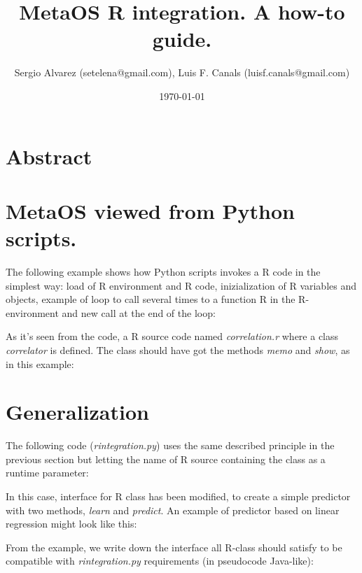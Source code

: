 \documentclass[11pt,a4paper]{article}
\title{MetaOS R integration. A how-to guide.}
\author{Sergio Alvarez (setelena@gmail.com),
    Luis F. Canals (luisf.canals@gmail.com)}
\begin{document}
\date{\today}
\maketitle


\section{Abstract}

\section{MetaOS viewed from Python scripts.}

The following example shows how Python scripts invokes a R code in 
the simplest way: load of R environment and R code, inizialization of R
variables and objects, example of loop to call several times to a function
R in the R-environment and new call at the end of the loop:

\lstset{language=Python,frame=single,tabsize=2,basicstyle=\tiny}


As it's seen from the code, a R source code named \emph{correlation.r}
where a class \emph{correlator} is defined. The class should have got the
methods \emph{memo} and \emph{show}, as in this example:

\lstset{language=R,frame=single,tabsize=2,basicstyle=\tiny}




\section{Generalization}

The following code (\emph{rintegration.py}) uses the same described principle 
in the previous section but letting the name of R source containing the 
class as a runtime parameter:

\lstset{language=Python,frame=single,tabsize=2,basicstyle=\tiny}


In this case, interface for R class has been modified, to create a simple
predictor with two methods, \emph{learn} and \emph{predict}. An example of
predictor based on linear regression might look like this:

From the example, we write down the interface all R-class should satisfy
to be compatible with \emph{rintegration.py} requirements (in pseudocode 
Java-like):
\end{document}
